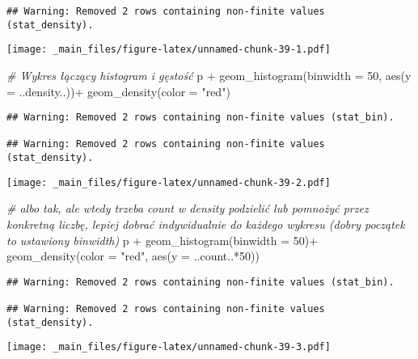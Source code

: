 \documentclass[
]{book}
\newenvironment{Shaded}{\begin{snugshade}}{\end{snugshade}}
\newcommand{\AttributeTok}[1]{\textcolor[rgb]{0.77,0.63,0.00}{#1}}
\newcommand{\CommentTok}[1]{\textcolor[rgb]{0.56,0.35,0.01}{\textit{#1}}}
\newcommand{\DecValTok}[1]{\textcolor[rgb]{0.00,0.00,0.81}{#1}}
\newcommand{\FunctionTok}[1]{\textcolor[rgb]{0.00,0.00,0.00}{#1}}
\newcommand{\NormalTok}[1]{#1}
\newcommand{\SpecialCharTok}[1]{\textcolor[rgb]{0.00,0.00,0.00}{#1}}
\newcommand{\StringTok}[1]{\textcolor[rgb]{0.31,0.60,0.02}{#1}}
\begin{document}
\begin{verbatim}
## Warning: Removed 2 rows containing non-finite values (stat_density).
\end{verbatim}

\texttt{[image: \_main\_files/figure-latex/unnamed-chunk-39-1.pdf]}

\begin{Shaded}
\begin{Highlighting}[]
\CommentTok{\# Wykres łączący histogram i gęstość}
\NormalTok{p }\SpecialCharTok{+} \FunctionTok{geom\_histogram}\NormalTok{(}\AttributeTok{binwidth =} \DecValTok{50}\NormalTok{, }\FunctionTok{aes}\NormalTok{(}\AttributeTok{y =}\NormalTok{ ..density..))}\SpecialCharTok{+}
  \FunctionTok{geom\_density}\NormalTok{(}\AttributeTok{color =} \StringTok{"red"}\NormalTok{)}
\end{Highlighting}
\end{Shaded}

\begin{verbatim}
## Warning: Removed 2 rows containing non-finite values (stat_bin).

## Warning: Removed 2 rows containing non-finite values (stat_density).
\end{verbatim}

\texttt{[image: \_main\_files/figure-latex/unnamed-chunk-39-2.pdf]}

\begin{Shaded}
\begin{Highlighting}[]
\CommentTok{\# albo tak, ale wtedy trzeba count w density podzielić lub pomnożyć przez konkretną liczbę, lepiej dobrać indywidualnie do każdego wykresu (dobry początek to ustawiony binwidth)}
\NormalTok{p }\SpecialCharTok{+} \FunctionTok{geom\_histogram}\NormalTok{(}\AttributeTok{binwidth =} \DecValTok{50}\NormalTok{)}\SpecialCharTok{+}
  \FunctionTok{geom\_density}\NormalTok{(}\AttributeTok{color =} \StringTok{"red"}\NormalTok{, }\FunctionTok{aes}\NormalTok{(}\AttributeTok{y =}\NormalTok{ ..count..}\SpecialCharTok{*}\DecValTok{50}\NormalTok{))}
\end{Highlighting}
\end{Shaded}

\begin{verbatim}
## Warning: Removed 2 rows containing non-finite values (stat_bin).

## Warning: Removed 2 rows containing non-finite values (stat_density).
\end{verbatim}

\texttt{[image: \_main\_files/figure-latex/unnamed-chunk-39-3.pdf]}
\end{document}
